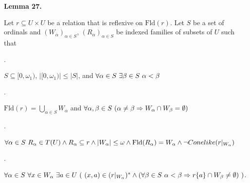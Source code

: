   
 
 
\par\medskip\noindent\textbf{Lemma 27.}\par
 
 
Let $r\subseteq U\times U$ be a relation that is reflexive on $\mathrm{Fld}(r)$. Let $S$ be a set of ordinals and $(W_{\alpha})_{\alpha\in S}$, $(R_{\alpha})_{\alpha\in S}$ be indexed families of subsets of $U$ such that\par
  
\par{}. 
 
$S\subseteq[0,\omega_{1})$, $|[0,\omega_{1})|\leq|S|$, and $\forall\alpha\in S\leavevmode\nobreak\ \exists\beta\in S\leavevmode\nobreak\ %
\alpha<\beta$\par
 
 
 
\par{}. 
 
$\mathrm{Fld}(r)=\bigcup_{\alpha\in S}W_{\alpha}$ and $\forall\alpha,\beta\in S\leavevmode\nobreak\ (\alpha\neq\beta\Rightarrow W_{%
\alpha}\cap W_{\beta}=\emptyset)$\par
 
 
 
\par{}. 
 
$\forall\alpha\in S\leavevmode\nobreak\ R_{\alpha}\in T(U)\wedge R_{\alpha}%
\subseteq r\wedge|W_{\alpha}|\leq\omega\wedge\mathrm{Fld}(R_{\alpha})=W_{%
\alpha}\wedge\neg Conelike(r|_{W_{\alpha}})$\par
 
 
 
\par{}. 
 
$\forall\alpha\in S\leavevmode\nobreak\ \forall x\in W_{\alpha}\leavevmode%
\nobreak\ \exists a\in U\,\left(\leavevmode\nobreak\ (x,a)\in(r|_{W_{\alpha}})%
^{*}\wedge(\forall\beta\in S\leavevmode\nobreak\ \alpha<\beta\Rightarrow r\{a%
\}\cap W_{\beta}\neq\emptyset)\leavevmode\nobreak\ \right)$.\par
 
 
  
 

